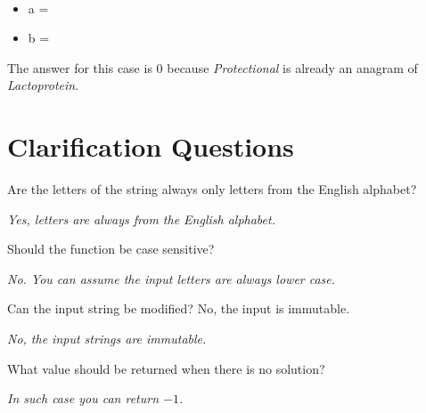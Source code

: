 \begin{exercise}
	\begin{example}
		\hfill \\
		\begin{itemize}
			\item[] 	a = 
			\item[] 	b = 
		\end{itemize}
		The answer for this case is $0$ because \emph{Protectional} is already an anagram of \emph{Lactoprotein}.
	\end{example}
\end{exercise}

\section{Clarification Questions}

\begin{QandA}
	\item \begin{questionitem} \begin{question} Are the letters of the string always only letters from the English alphabet?    \end{question}      
    \begin{answered}
		\textit{Yes, letters are always from the English alphabet.}
	\end{answered} \end{questionitem}
	
	\item \begin{questionitem} \begin{question} Should the function be case sensitive?   \end{question}      
    \begin{answered}
		\textit{ No. You can assume the input letters are always lower case.}
	\end{answered} \end{questionitem}
	\item \begin{questionitem} \begin{question} Can the input string be modified? No, the input is immutable.  \end{question}      
    \begin{answered}
		\textit{No, the input strings are immutable.}
	\end{answered} \end{questionitem}

	\item \begin{questionitem} \begin{question} What value should be returned when there is no solution?  \end{question}      
    \begin{answered}
		\textit{In such case you can return $-1$.}
	\end{answered} \end{questionitem}
\end{QandA}

